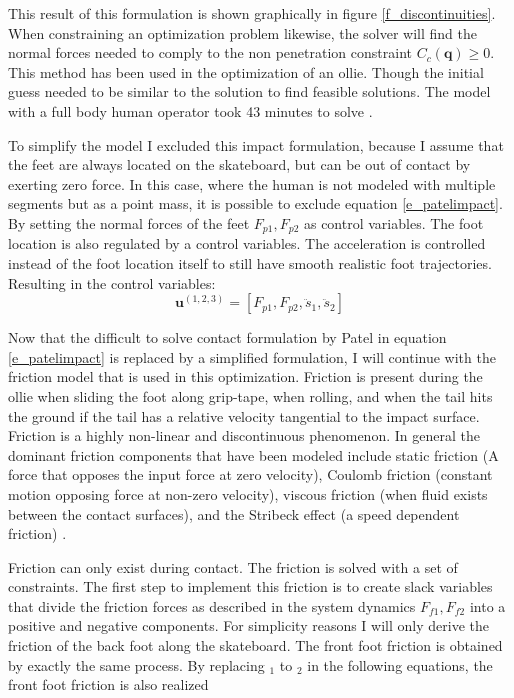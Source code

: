 \documentclass[default,iicol]{sn-jnl}
\theoremstyle{thmstyleone}%
\theoremstyle{thmstyletwo}%
\theoremstyle{thmstylethree}%
\begin{document}
This result of this formulation is shown graphically in figure
\ref{f_discontinuities}. When constraining an optimization problem likewise,
the solver will find the normal forces needed to comply to the non penetration
constraint $C_c(\mathbf{q}) \geq 0$. This method has been used in the
optimization of an ollie. Though the initial guess needed to be similar to the
solution to find feasible solutions. The model with a full body human operator
took 43 minutes to solve \cite{shield_contact-implicit_2022}.

To simplify the model I excluded this impact formulation, because I assume that
the feet are always located on the skateboard, but can be out of contact by
exerting zero force. In this case, where the human is not modeled with multiple
segments but as a point mass, it is possible to exclude equation
\ref{e_patelimpact}. By setting the normal forces of the feet $F_{p1},F_{p2}$
as control variables. The foot location is also regulated by a control
variables. The acceleration is controlled instead of the foot location itself
to still have smooth realistic foot trajectories. Resulting in the control
variables:
%
\begin{equation}
    \mathbf{u}^{(1,2,3)} = [F_{p1},F_{p2},\ddot s_1, \ddot s_2]    
\end{equation}

Now that the difficult to solve contact formulation by Patel in equation
\ref{e_patelimpact} is replaced by a simplified formulation, I will continue
with the friction model that is used in this optimization.  Friction is present
during the ollie when sliding the foot along grip-tape, when rolling, and when
the tail hits the ground if the tail has a relative velocity tangential to the
impact surface. Friction is a highly non-linear and discontinuous phenomenon.
In general the dominant friction components that have been modeled include
static friction (A force that opposes the input force at zero velocity),
Coulomb friction (constant motion opposing force at non-zero velocity), viscous
friction (when fluid exists between the contact surfaces), and the Stribeck
effect (a speed dependent friction) \cite{makkar_new_2005}. 

Friction can only exist during contact. The friction is solved with a set of
constraints. The first step to implement this friction is to create slack
variables that divide the friction forces as described in the system dynamics
$F_{f1},F_{f2}$ into a positive and negative components. For simplicity reasons
I will only derive the friction of the back foot along the skateboard. The
front foot friction is obtained by exactly the same process. By replacing $_1$
to $_2$ in the following equations, the front foot friction is also realized
\end{document}
